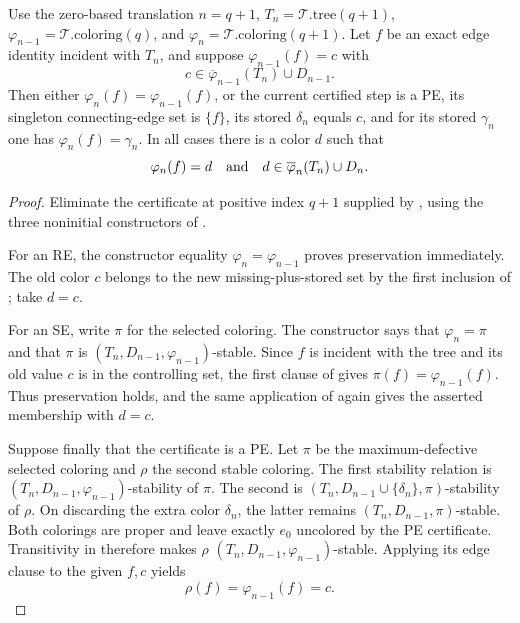 \begin{lemma}
Use the zero-based translation
\(n=q+1\), \(T_n=\mathcal T.\mathrm{tree}(q+1)\),
\(\varphi_{n-1}=\mathcal T.\mathrm{coloring}(q)\), and
\(\varphi_n=\mathcal T.\mathrm{coloring}(q+1)\).  Let \(f\) be an exact
edge identity incident with \(T_n\), and suppose
\(\varphi_{n-1}(f)=c\) with
\[
 c\in\overline\varphi_{n-1}(T_n)\cup D_{n-1}.
\]
Then either \(\varphi_n(f)=\varphi_{n-1}(f)\), or the current certified
step is a PE, its singleton connecting-edge set is \(\{f\}\), its stored
\(\delta_n\) equals \(c\), and for its stored \(\gamma_n\) one has
\(\varphi_n(f)=\gamma_n\).  In all cases there is a color \(d\) such that
\[
 \varphi_n(f)=d
 \quad\hbox{and}\quad
 d\in\overline\varphi_n(T_n)\cup D_n.
\]
\end{lemma}
\begin{proof}
Eliminate the certificate at positive index \(q+1\) supplied by
, using the three noninitial constructors of
.

For an RE, the constructor equality
\(\varphi_n=\varphi_{n-1}\) proves preservation immediately.  The old
color \(c\) belongs to the new missing-plus-stored set by the first
inclusion of ; take \(d=c\).

For an SE, write \(\pi\) for the selected coloring.  The constructor says
that \(\varphi_n=\pi\) and that \(\pi\) is
\((T_n,D_{n-1},\varphi_{n-1})\)-stable.  Since \(f\) is incident with
the tree and its old value \(c\) is in the controlling set, the first
clause of  gives
\(\pi(f)=\varphi_{n-1}(f)\).  Thus preservation holds, and the same
application of  again gives the asserted
membership with \(d=c\).

Suppose finally that the certificate is a PE.  Let \(\pi\) be the
maximum-defective selected coloring and \(\rho\) the second stable
coloring.  The first stability relation is
\((T_n,D_{n-1},\varphi_{n-1})\)-stability of \(\pi\).  The second is
\((T_n,D_{n-1}\cup\{\delta_n\},\pi)\)-stability of \(\rho\).  On
discarding the extra color \(\delta_n\), the latter remains
\((T_n,D_{n-1},\pi)\)-stable.  Both colorings are proper and leave exactly
\(e_0\) uncolored by the PE certificate.  Transitivity in
 therefore makes \(\rho\)
\((T_n,D_{n-1},\varphi_{n-1})\)-stable.  Applying its edge clause to the
given \(f,c\) yields
\[
 \rho(f)=\varphi_{n-1}(f)=c.                                    \tag{1}
\]


\end{proof}
